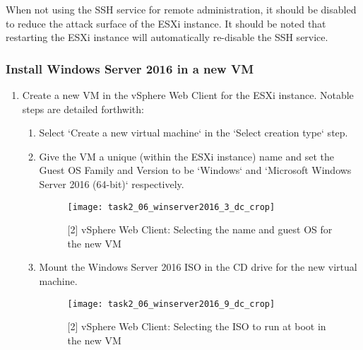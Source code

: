 \noindent When not using the SSH service for remote administration, it should be disabled to reduce the attack surface of the ESXi instance. It should be noted that restarting the ESXi instance will automatically re-disable the SSH service.

\subsubsection{Install Windows Server 2016 in a new VM}
\begin{enumerate}[series=task2methodology2]
  \item Create a new VM in the vSphere Web Client for the ESXi instance. Notable steps are detailed forthwith:
    \begin{enumerate}[label=(\alph*)]
      \item Select `Create a new virtual machine` in the `Select creation type` step.
      \item Give the VM a unique (within the ESXi instance) name and set the Guest OS Family and Version to be `Windows` and `Microsoft Windows Server 2016 (64-bit)` respectively.
        \begin{figure}[H]
          \centering
          \captionsetup{skip=2pt}
          \texttt{[image: task2\_06\_winserver2016\_3\_dc\_crop]}
          \caption{[2] vSphere Web Client: Selecting the name and guest OS for the new VM}
          \label{fig:task2:vspherewc_newvm2}
        \end{figure}
      \item Mount the Windows Server 2016 ISO in the CD drive for the new virtual machine.
        \begin{figure}[H]
          \centering
          \captionsetup{skip=2pt}
          \texttt{[image: task2\_06\_winserver2016\_9\_dc\_crop]}
          \caption{[2] vSphere Web Client: Selecting the ISO to run at boot in the new VM}
          \label{fig:task2:vspherewc_newvm3}
        \end{figure}
    \end{enumerate}
\end{enumerate}

